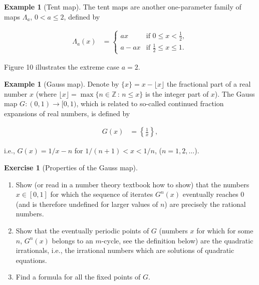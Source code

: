 \documentclass[11pt]{report}
\theoremstyle{plain}
\theoremstyle{definition}
\newtheorem{example}[thm]{Example}
\newtheorem{xexercise}[thm]{Exercise}
\begin{document}
\begin{example}[Tent map]
The tent maps are another one-parameter family of
maps $\Lambda_a$, $0<a\le 2$, defined by

\begin{align*}
\Lambda_a(x) &= \begin{cases}
ax & \textrm{if }0\le x<\tfrac12, \\ a-ax & \textrm{if }\tfrac12 \le x \le 1.
\end{cases}
\end{align*}

Figure 10 illustrates the extreme case $a=2$.
\end{example}

\begin{example}[Gauss map]
Denote by $\{ x \}=x-\lfloor x\rfloor$ the fractional
part of a real number $x$ (where
$\lfloor x\rfloor = \max\{ n\in\mathbb{Z}\,:\,n\le
x\}$
is the integer part of $x$). The Gauss map
$G:(0,1)\to[0,1)$, which is related to so-called
continued fraction expansions of real numbers, is
defined by

\begin{align*}
G(x) &= \left\{ \frac{1}{x} \right\},
\end{align*}

i.e., $G(x)=1/x-n$ for $1/(n+1)<x<1/n$,
($n=1,2,\ldots$).
\end{example}

\begin{xexercise}[Properties of the Gauss map]

\begin{enumerate}[label=\arabic*.]
\item Show (or read in a number theory textbook how to
show) that the numbers $x\in [0,1]$ for which the
sequence of iterates $G^n(x)$ eventually reaches $0$
(and is therefore undefined for larger values of $n$)
are precisely the rational numbers.

\item Show that the eventually periodic points of $G$
(numbers $x$ for which for some $n$, $G^n(x)$ belongs
to an $m$-cycle, see the definition below) are the
quadratic irrationals, i.e., the irrational numbers
which are solutions of quadratic equations.

\item Find a formula for all the fixed points of $G$.
\end{enumerate}

\end{xexercise}
\end{document}
